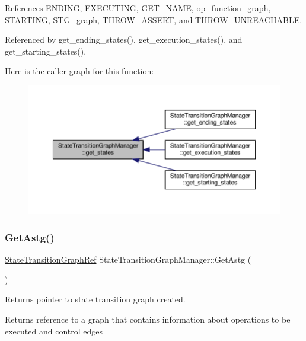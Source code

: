 References E\+N\+D\+I\+NG, E\+X\+E\+C\+U\+T\+I\+NG, G\+E\+T\+\_\+\+N\+A\+ME, op\+\_\+function\+\_\+graph, S\+T\+A\+R\+T\+I\+NG, S\+T\+G\+\_\+graph, T\+H\+R\+O\+W\+\_\+\+A\+S\+S\+E\+RT, and T\+H\+R\+O\+W\+\_\+\+U\+N\+R\+E\+A\+C\+H\+A\+B\+LE.



Referenced by get\+\_\+ending\+\_\+states(), get\+\_\+execution\+\_\+states(), and get\+\_\+starting\+\_\+states().

Here is the caller graph for this function\+:
\nopagebreak
\begin{figure}[H]
\begin{center}
\leavevmode
\includegraphics[width=350pt]{d9/dfd/classStateTransitionGraphManager_ac6b2201c821c65cbf25d0578eacdbb51_icgraph}
\end{center}
\end{figure}
\mbox{\label{classStateTransitionGraphManager_af85011ea587c18b8b4f9356483fe84b3}} 
\subsubsection{\texorpdfstring{Get\+Astg()}{GetAstg()}}
{\footnotesize\ttfamily \hyperlink{state__transition__graph_8hpp_a50ba60cd5e113de254d5d7638bbbba86}{State\+Transition\+Graph\+Ref} State\+Transition\+Graph\+Manager\+::\+Get\+Astg (\begin{DoxyParamCaption}{ }\end{DoxyParamCaption})}



Returns pointer to state transition graph created. 

\begin{DoxyReturn}{Returns}
reference to a graph that contains information about operations to be executed and control edges 
\end{DoxyReturn}


